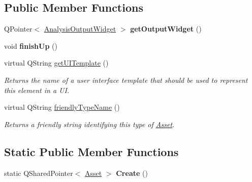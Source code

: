 \subsection*{Public Member Functions}
\begin{DoxyCompactItemize}
\item 
\hypertarget{class_picto_1_1_file_output_a94e93bc752859f09c4182d3d1080bbcf}{Q\-Pointer$<$ \hyperlink{class_picto_1_1_analysis_output_widget}{Analysis\-Output\-Widget} $>$ {\bfseries get\-Output\-Widget} ()}\label{class_picto_1_1_file_output_a94e93bc752859f09c4182d3d1080bbcf}

\item 
\hypertarget{class_picto_1_1_file_output_a086ea3183bcff4a23ba6f67ee746d1de}{void {\bfseries finish\-Up} ()}\label{class_picto_1_1_file_output_a086ea3183bcff4a23ba6f67ee746d1de}

\item 
\hypertarget{class_picto_1_1_file_output_ac8e79d8eb4011355983312a6bb5a1522}{virtual Q\-String \hyperlink{class_picto_1_1_file_output_ac8e79d8eb4011355983312a6bb5a1522}{get\-U\-I\-Template} ()}\label{class_picto_1_1_file_output_ac8e79d8eb4011355983312a6bb5a1522}

\begin{DoxyCompactList}\small\item\em Returns the name of a user interface template that should be used to represent this element in a U\-I. \end{DoxyCompactList}\item 
virtual Q\-String \hyperlink{class_picto_1_1_file_output_a44fff0a846a6dd650ed13a56aba8d8f3}{friendly\-Type\-Name} ()
\begin{DoxyCompactList}\small\item\em Returns a friendly string identifying this type of \hyperlink{class_picto_1_1_asset}{Asset}. \end{DoxyCompactList}\end{DoxyCompactItemize}
\subsection*{Static Public Member Functions}
\begin{DoxyCompactItemize}
\item 
\hypertarget{class_picto_1_1_file_output_a7649ed401195435ebb880e3071a733fb}{static Q\-Shared\-Pointer$<$ \hyperlink{class_picto_1_1_asset}{Asset} $>$ {\bfseries Create} ()}\label{class_picto_1_1_file_output_a7649ed401195435ebb880e3071a733fb}

\end{DoxyCompactItemize}
